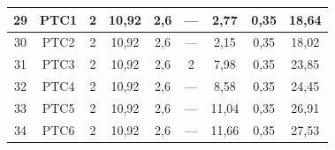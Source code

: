 \documentclass[	DIV=calc,%
							paper=a4,%
							fontsize=12pt,%
							onecolumn]{scrartcl}	 					%
\begin{document}
{\begin{tabular}{|c|c|c|c|c|c|c|c|c|}
	29                 & PTC1               & 2                                                    & 10,92                                       & 2,6                                           & ---                                           & 2,77                                             & 0,35                                            & 18,64                                                             \\ \hline
	30                 & PTC2               & 2                                                    & 10,92                                       & 2,6                                           & ---                                           & 2,15                                             & 0,35                                            & 18,02                                                             \\ \hline
	31                 & PTC3               & 2                                                    & 10,92                                       & 2,6                                           & 2                                             & 7,98                                             & 0,35                                            & 23,85                                                             \\ \hline
	32                 & PTC4               & 2                                                    & 10,92                                       & 2,6                                           & ---                                           & 8,58                                             & 0,35                                            & 24,45                                                             \\ \hline
	33                 & PTC5               & 2                                                    & 10,92                                       & 2,6                                           & ---                                           & 11,04                                            & 0,35                                            & 26,91                                                             \\ \hline
	34                 & PTC6               & 2                                                    & 10,92                                       & 2,6                                           & ---                                           & 11,66                                            & 0,35                                            & 27,53                                                             \\ \hline

\end{tabular}}
\end{document}
